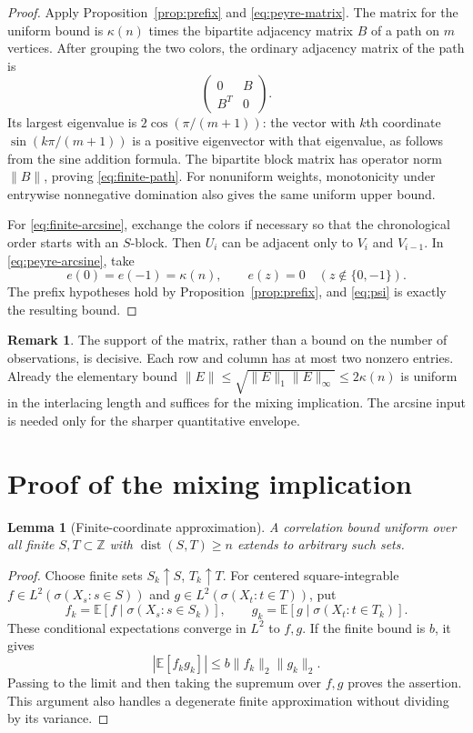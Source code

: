 \documentclass[11pt]{amsart}
\numberwithin{equation}{section}
\newtheorem{lemma}[theorem]{Lemma}
\theoremstyle{definition}
\newtheorem{remark}[theorem]{Remark}
\newcommand{\EE}{\mathbb E}
\newcommand{\ZZ}{\mathbb Z}
\newcommand{\dist}{\operatorname{dist}}
\begin{document}
\begin{proof}
Apply Proposition~\ref{prop:prefix} and \eqref{eq:peyre-matrix}. The matrix for the uniform bound is $\kappa(n)$ times the bipartite adjacency matrix $B$ of a path on $m$ vertices. After grouping the two colors, the ordinary adjacency matrix of the path is
\[
\begin{pmatrix}0&B\\ B^T&0\end{pmatrix}.
\]
Its largest eigenvalue is $2\cos(\pi/(m+1))$: the vector with $k$th coordinate $\sin(k\pi/(m+1))$ is a positive eigenvector with that eigenvalue, as follows from the sine addition formula. The bipartite block matrix has operator norm $\|B\|$, proving \eqref{eq:finite-path}. For nonuniform weights, monotonicity under entrywise nonnegative domination also gives the same uniform upper bound.

For \eqref{eq:finite-arcsine}, exchange the colors if necessary so that the chronological order starts with an $S$-block. Then $U_i$ can be adjacent only to $V_i$ and $V_{i-1}$. In \eqref{eq:peyre-arcsine}, take
\[
e(0)=e(-1)=\kappa(n),\qquad e(z)=0\quad(z\notin\{0,-1\}).
\]
The prefix hypotheses hold by Proposition~\ref{prop:prefix}, and \eqref{eq:psi} is exactly the resulting bound.
\end{proof}

\begin{remark}
The support of the matrix, rather than a bound on the number of observations, is decisive. Each row and column has at most two nonzero entries. Already the elementary bound $\|E\|\le\sqrt{\|E\|_1\|E\|_\infty}\le2\kappa(n)$ is uniform in the interlacing length and suffices for the mixing implication. The arcsine input is needed only for the sharper quantitative envelope.
\end{remark}

\section{Proof of the mixing implication}\label{sec:proof-main}

\begin{lemma}[Finite-coordinate approximation]\label{lem:finite-approx}
A correlation bound uniform over all finite $S,T\subset\ZZ$ with $\dist(S,T)\ge n$ extends to arbitrary such sets.
\end{lemma}

\begin{proof}
Choose finite sets $S_k\uparrow S$, $T_k\uparrow T$. For centered square-integrable $f\in L^2(\sigma(X_s:s\in S))$ and $g\in L^2(\sigma(X_t:t\in T))$, put
\[
f_k=\EE[f\mid\sigma(X_s:s\in S_k)],\qquad
g_k=\EE[g\mid\sigma(X_t:t\in T_k)].
\]
These conditional expectations converge in $L^2$ to $f,g$. If the finite bound is $b$, it gives
\[
|\EE[f_kg_k]|\le b\|f_k\|_2\|g_k\|_2.
\]
Passing to the limit and then taking the supremum over $f,g$ proves the assertion. This argument also handles a degenerate finite approximation without dividing by its variance.
\end{proof}
\end{document}
